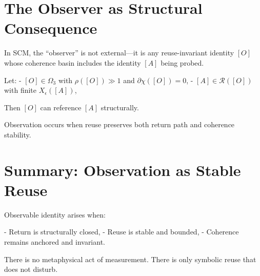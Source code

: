 \section{The Observer as Structural Consequence} \label{sec:observer}

In SCM, the “observer” is not external—it is any reuse-invariant identity $[O]$ whose coherence basin includes the identity $[A]$ being probed.

Let:
- $[O] \in \Omega_3$ with $\rho([O]) \gg 1$ and $\partial\chi([O]) = 0$,
- $[A] \in \mathcal{R}([O])$ with finite $X_\epsilon([A])$,

Then $[O]$ can reference $[A]$ structurally.

Observation occurs when reuse preserves both return path and coherence stability.

\section{Summary: Observation as Stable Reuse} \label{sec:observation-summary}

Observable identity arises when:

- Return is structurally closed,
- Reuse is stable and bounded,
- Coherence remains anchored and invariant.

There is no metaphysical act of measurement.  
There is only symbolic reuse that does not disturb.

